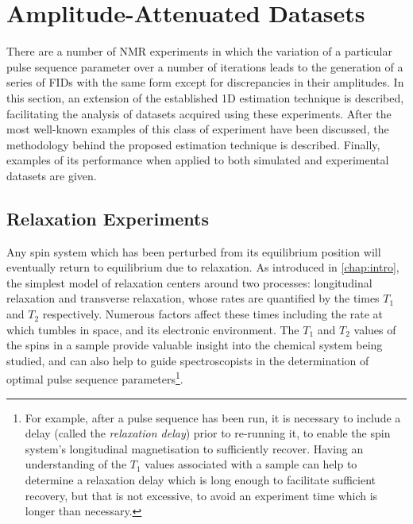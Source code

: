 \section{Amplitude-Attenuated Datasets}
\label{sec:seq}
There are a number of \ac{NMR} experiments in which the
variation of a particular pulse sequence parameter over a number of iterations
leads to the generation of a series of
\acp{FID} with the same form except for discrepancies in their amplitudes.
In this section, an extension of the established \ac{1D} estimation
technique is described, facilitating the analysis of datasets acquired using
these experiments.
After the most well-known examples of this class of experiment have been
discussed, the methodology behind the proposed estimation technique is described.
Finally, examples of its performance when applied to both simulated and
experimental datasets are given.

\subsection{Relaxation Experiments}
\label{subsec:relaxation_experiments}
Any spin system which has been perturbed from its equilibrium position will
eventually return to equilibrium due to relaxation. As introduced in
\cref{chap:intro}, the simplest model of relaxation centers around two
processes: longitudinal relaxation and transverse relaxation, whose rates are
quantified by the times $T_1$ and  $T_2$ respectively.
Numerous factors affect these times including the rate at which
\label{corr:spin-molecule}
tumbles in space, and its electronic environment.
The $T_1$ and $T_2$ values of the spins in a sample provide valuable insight
into the chemical system being studied, and can also help to guide
spectroscopists in the determination of optimal pulse sequence
parameters\footnote{
    For example, after a pulse sequence has been run, it is necessary to include a
    delay (called the \emph{relaxation delay}) prior to
    re-running it, to enable the spin system's longitudinal magnetisation to
    sufficiently recover. Having an understanding of the $T_1$ values
    associated with a sample can help to determine a relaxation delay which is
    long enough to facilitate sufficient recovery, but that is not excessive, to
    avoid an experiment time which is longer than necessary.
}.

